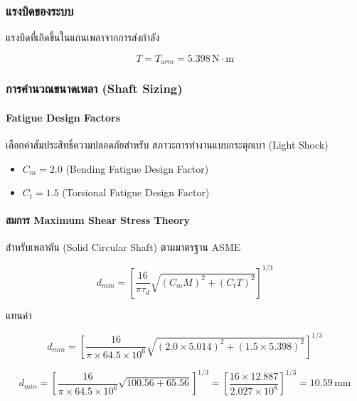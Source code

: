 \subsubsection{แรงบิดของระบบ}

แรงบิดที่เกิดขึ้นในแกนเพลาจากการส่งกำลัง

\begin{equation}
  T = T_{arm} = 5.398\,\text{N}\cdot\text{m}
  \label{eq:shaft_torque}
\end{equation}

\subsubsection{การคำนวณขนาดเพลา (Shaft Sizing)}

\paragraph{Fatigue Design Factors}

เลือกค่าสัมประสิทธิ์ความปลอดภัยสำหรับ
สภาวะการทำงานแบบกระตุกเบา (Light Shock)
\begin{itemize}
  \item $C_m = 2.0$ (Bending Fatigue Design Factor)
  \item $C_t = 1.5$ (Torsional Fatigue Design Factor)
\end{itemize}

\paragraph{สมการ Maximum Shear Stress Theory}

สำหรับเพลาตัน (Solid Circular Shaft)
ตามมาตรฐาน ASME

\begin{equation}
  d_{min} = \left[
    \frac{16}{\pi \tau_d}
    \sqrt{(C_m M)^2 + (C_t T)^2}
  \right]^{1/3}
  \label{eq:shaft_diameter}
\end{equation}

แทนค่า

\begin{equation}
  d_{min} = \left[
    \frac{16}{\pi \times 64.5 \times 10^6}
    \sqrt{(2.0 \times 5.014)^2 + (1.5 \times 5.398)^2}
  \right]^{1/3}
\end{equation}

\begin{equation}
  d_{min} = \left[
    \frac{16}{\pi \times 64.5 \times 10^6}
    \sqrt{100.56 + 65.56}
  \right]^{1/3}
  = \left[
    \frac{16 \times 12.887}{2.027 \times 10^8}
  \right]^{1/3}
  = 10.59\,\text{mm}
  \label{eq:shaft_result}
\end{equation}

